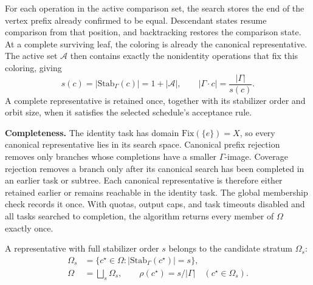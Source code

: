\documentclass[a5paper, 10pt]{article}
\begin{document}
For each operation in the active comparison set, the search stores the end of the vertex prefix already confirmed to be equal. Descendant states resume comparison from that position, and backtracking restores the comparison state. At a complete surviving leaf, the coloring is already the canonical representative. The active set $\mathcal{A}$ then contains exactly the nonidentity operations that fix this coloring, giving
\begin{equation}
 s(c)=|\mathrm{Stab}_{\Gamma}(c)|=1+|\mathcal{A}|,
 \qquad |\Gamma\cdot c|=\frac{|\Gamma|}{s(c)}.
\label{eq:active_stabilizer}
\end{equation}
A complete representative is retained once, together with its stabilizer order and orbit size, when it satisfies the selected schedule's acceptance rule.

\medskip
\noindent\textbf{Completeness.}
The identity task has domain $\mathrm{Fix}(\{e\})=X$, so every canonical representative lies in its search space. Canonical prefix rejection removes only branches whose completions have a smaller $\Gamma$-image. Coverage rejection removes a branch only after its canonical search has been completed in an earlier task or subtree. Each canonical representative is therefore either retained earlier or remains reachable in the identity task. The global membership check records it once. With quotas, output caps, and task timeouts disabled and all tasks searched to completion, the algorithm returns every member of $\Omega$ exactly once.

A representative with full stabilizer order $s$ belongs to the candidate stratum $\Omega_s$:
\begin{equation}
\begin{aligned}
\Omega_s&=\{c^\star\in\Omega:|\mathrm{Stab}_{\Gamma}(c^\star)|=s\},\\
\Omega&=\bigsqcup_s\Omega_s,\qquad
\rho(c^\star)=s/|\Gamma|\quad(c^\star\in\Omega_s).
\end{aligned}
\label{eq:rho_strata}
\end{equation}
\end{document}
